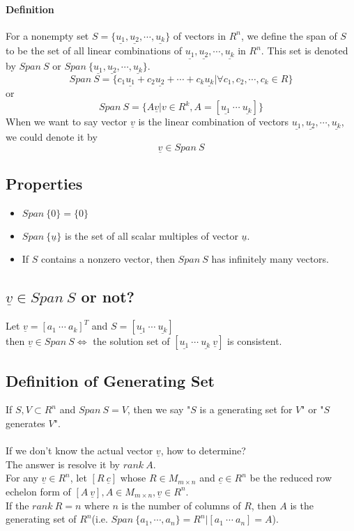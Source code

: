 \documentclass[12pt]{article}
\begin{document}
\paragraph{Definition}
For a nonempty set $S=\lbrace \underline{u_1}, \underline{u_2},\cdots,\underline{u_k} \rbrace$ of vectors in $R^n$, we define the span of $S$ to be the set of all linear combinations of $\underline{u_1}, \underline{u_2},\cdots,\underline{u_k}$ in $R^n$. This set is denoted by $Span\ S$ or $Span \ \lbrace \underline{u_1}, \underline{u_2},\cdots,\underline{u_k} \rbrace$.
$$Span\ S=\lbrace c_1\underline{u_1}+c_2\underline{u_2}+\cdots+c_k\underline{u_k}|\forall c_1,c_2,\cdots,c_k \in R \rbrace$$
or
$$
Span\ S=\lbrace A\underline{v}|v \in R^k , A = [\underline{u_1}\ \cdots\ \underline{u_k}]\rbrace
$$
When we want to say vector $\underline{v}$ is the linear combination of vectors $\underline{u_1}, \underline{u_2},\cdots,\underline{u_k}$, we could denote it by
$$\underline{v} \in Span\ S$$
\subsection{Properties}
\begin{itemize}
\item $Span\ \lbrace 0\rbrace = \lbrace 0\rbrace$
\item $Span\ \lbrace \underline{u}\rbrace$ is the set of all scalar multiples of vector $\underline{u}$. 
\item If $S$ contains a nonzero vector, then $Span\ S$ has infinitely many vectors.
\end{itemize}

\subsection{$\underline{v} \in Span\ S$ or not?}
Let $\underline{v} = [a_1\ \cdots\ a_k]^T$ and  $S=[\underline{u_1}\ \cdots\ \underline{u_k}]$\\
then
$\underline{v} \in Span\ S \Leftrightarrow$
the solution set of $[\underline{u_1}\ \cdots\ \underline{u_k}\  \underline{v}]$ is consistent.

\subsection{Definition of Generating Set}
If $S,V \subset R^n$ and $Span\ S=V$, then we say "$S$ is a generating set for $V$" or "$S$ generates $V$".
\\\\
If we don't know the actual vector $\underline{v}$, how to determine? \\The answer is resolve it by $rank\ A$.\\
For any $\underline{v} \in R^n$, let $[R\ \underline{c}]$ whose $R \in M_{m \times n}$ and $\underline{c} \in R^n$ be the reduced row echelon form of $[A\ \underline{v}], A \in M_{m \times n}, \underline{v} \in R^n$.\\
If the $rank\ R=n$ where $n$ is the number of columns of $R$, then $A$ is the generating set of $R^n$(i.e. $Span\ \lbrace a_1,\cdots, a_n\rbrace = R^n | [a_1\ \cdots\ a_n] = A$).
\end{document}
